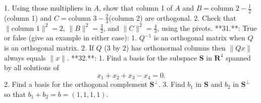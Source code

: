 1. Using those multipliers in \(A\), show that column 1 of \(A\) and \(B=\text{column 2}-\frac{1}{2}\)(column 1) and \(C=\text{column 3}-\frac{2}{3}\)(column 2) are orthogonal. 2. Check that \(\|\text{column 1}\|^{2}=2\), \(\|B\|^{2}=\frac{3}{2}\), and \(\|C\|^{2}=\frac{4}{3}\), using the pivots.
**31.**: True or false (give an example in either case): 1. \(Q^{-1}\) is an orthogonal matrix when \(Q\) is an orthogonal matrix. 2. If \(Q\) (3 by 2) has orthonormal columns then \(\|Qx\|\) always equals \(\|x\|\).
**32.**: 1. Find a basis for the subspace \(\mathbf{S}\) in \(\mathbf{R}^{4}\) spanned by all solutions of \[x_{1}+x_{2}+x_{3}-x_{4}=0.\] 2. Find a basis for the orthogonal complement \(\mathbf{S}^{\perp}\). 3. Find \(b_{1}\) in \(\mathbf{S}\) and \(b_{2}\) in \(\mathbf{S}^{\perp}\) so that \(b_{1}+b_{2}=b=(1,1,1,1)\).

 